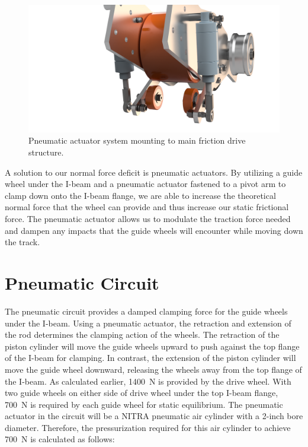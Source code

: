 \documentclass[main.tex]{subfiles}
\begin{document}
    \begin{figure}[H]
        \centering
        \includegraphics[width=\linewidth]{images/fig20}
        \caption{Pneumatic actuator system mounting to main friction drive structure.}
    \end{figure}
    A solution to our normal force deficit is pneumatic actuators. By utilizing a guide wheel under the I-beam and a pneumatic actuator fastened to a pivot arm to clamp down onto the I-beam flange, we are able to increase the theoretical normal force that the wheel can provide and thus increase our static frictional force. The pneumatic actuator allows us to modulate the traction force needed and dampen any impacts that the guide wheels will encounter while moving down the track.\\

    \section{Pneumatic Circuit}
	The pneumatic circuit provides a damped clamping force for the guide wheels under the I-beam. Using a pneumatic actuator, the retraction and extension of the rod determines the clamping action of the wheels. The retraction of the piston cylinder will move the guide wheels upward to push against the top flange of the I-beam for clamping. In contrast, the extension of the piston cylinder will move the guide wheel downward, releasing the wheels away from the top flange of the I-beam. As calculated earlier, \SI{1400}{N} is provided by the drive wheel. With two guide wheels on either side of drive wheel under the top I-beam flange, \SI{700}{N} is required by each guide wheel for static equilibrium. The pneumatic actuator in the circuit will be a NITRA pneumatic air cylinder with a 2-inch bore diameter. Therefore, the pressurization required for this air cylinder to achieve \SI{700}{N} is calculated as follows:\\
\end{document}
